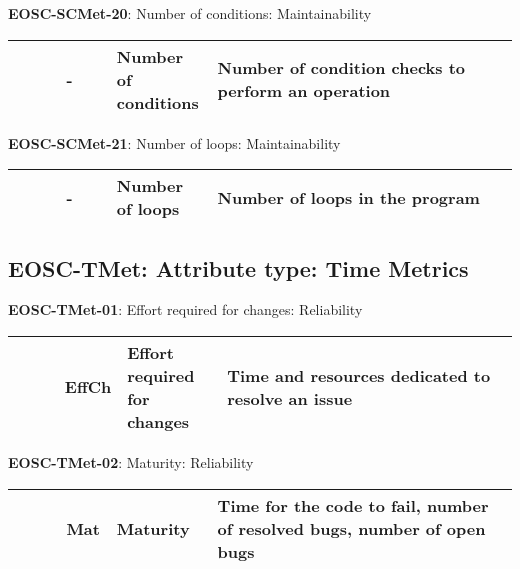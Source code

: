 \textbf{EOSC-SCMet-20}: Number of conditions: Maintainability
\nopagebreak[4]
\begin{center}
    \tabletail{\hline}
    \tiny
    \begin{supertabular}{|p{0.10\linewidth}|p{0.10\linewidth}|p{0.20\linewidth}|p{0.60\linewidth}|} \hline
        \cite{tanaka_software_1998} & - & Number of conditions & Number of condition checks to perform an operation\\ \hline
    \end{supertabular}
\end{center}

\textbf{EOSC-SCMet-21}: Number of loops: Maintainability
\nopagebreak[4]
\begin{center}
    \tabletail{\hline}
    \tiny
    \begin{supertabular}{|p{0.10\linewidth}|p{0.10\linewidth}|p{0.20\linewidth}|p{0.60\linewidth}|} \hline
        \cite{tanaka_software_1998} & - & Number of loops & Number of loops in the program\\ \hline
    \end{supertabular}
\end{center}

\subsection{EOSC-TMet: Attribute type: Time Metrics}

\textbf{EOSC-TMet-01}: Effort required for changes: Reliability
\nopagebreak[4]
\begin{center}
    \tabletail{\hline}
    \tiny
    \begin{supertabular}{|p{0.10\linewidth}|p{0.10\linewidth}|p{0.20\linewidth}|p{0.60\linewidth}|} \hline
        \cite{montagud_systematic_2012} & EffCh & Effort required for changes & Time and resources dedicated to resolve an issue\\ \hline
    \end{supertabular}
\end{center}

\textbf{EOSC-TMet-02}: Maturity: Reliability
\nopagebreak[4]
\begin{center}
    \tabletail{\hline}
    \tiny
    \begin{supertabular}{|p{0.10\linewidth}|p{0.10\linewidth}|p{0.20\linewidth}|p{0.60\linewidth}|} \hline
        \cite{montagud_systematic_2012} & Mat & Maturity & Time for the code to fail, number of resolved bugs, number of open bugs\\ \hline
    \end{supertabular}
\end{center}

